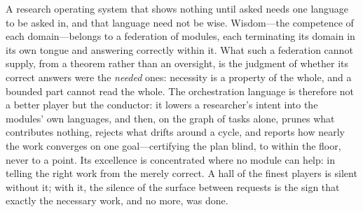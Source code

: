 \documentclass[twocolumn,11pt,a4paper]{article}
\theoremstyle{sup}
\theoremstyle{definition}
\theoremstyle{remark}
\begin{document}
A research operating system that shows nothing until asked needs one language to
be asked in, and that language need not be wise. Wisdom---the competence of each
domain---belongs to a federation of modules, each terminating its domain in its own
tongue and answering correctly within it. What such a federation cannot supply,
from a theorem rather than an oversight, is the judgment of whether its correct
answers were the \emph{needed} ones: necessity is a property of the whole, and a
bounded part cannot read the whole. The orchestration language is therefore not a
better player but the conductor: it lowers a researcher's intent into the modules'
own languages, and then, on the graph of tasks alone, prunes what contributes
nothing, rejects what drifts around a cycle, and reports how nearly the work
converges on one goal---certifying the plan blind, to within the floor, never to a
point. Its excellence is concentrated where no module can help: in telling the
right work from the merely correct. A hall of the finest players is silent without
it; with it, the silence of the surface between requests is the sign that exactly
the necessary work, and no more, was done.



\end{document}
